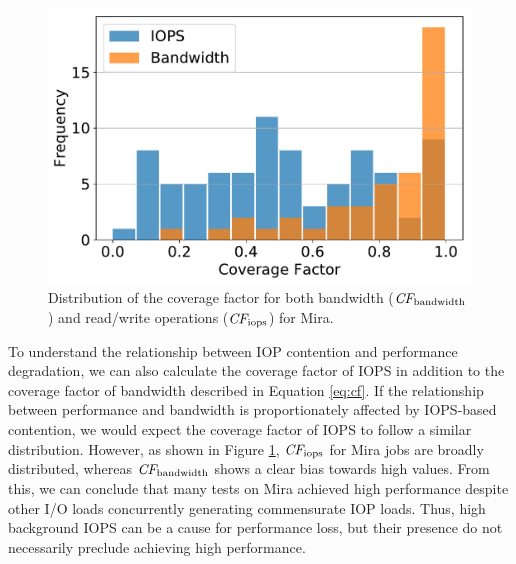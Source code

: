 \documentclass[conference,10pt,compsocconf]{IEEEtran}
\begin{document}
\begin{figure}[t]
    \centering
    \includegraphics[width=\columnwidth]{figs/hist-cf-bw-and-ops.pdf}
    \caption{Distribution  of the coverage factor for both bandwidth ($\textit{CF}_{\textup{bandwidth}}$) and read/write operations ($\textit{CF}_{\textup{iops}}$) for Mira.
    }
    \label{fig:hist-cf-mira}
\end{figure}

To understand the relationship between IOP contention and performance degradation, we can also calculate the coverage factor of IOPS in addition to the coverage factor of bandwidth described in Equation \ref{eq:cf}.
If the relationship between performance and bandwidth is proportionately affected by IOPS-based contention, we would expect the coverage factor of IOPS to follow a similar distribution.
However, as shown in Figure \ref{fig:hist-cf-mira}, $\textit{CF}_{\textup{iops}}$ for Mira jobs are broadly distributed, whereas $\textit{CF}_{\textup{bandwidth}}$ shows a clear bias towards high values.
From this, we can conclude that many tests on Mira achieved high performance despite other I/O loads concurrently generating commensurate IOP loads.
Thus, high background IOPS can be a cause for performance loss, but their presence do not necessarily preclude achieving high performance.

\end{document}
